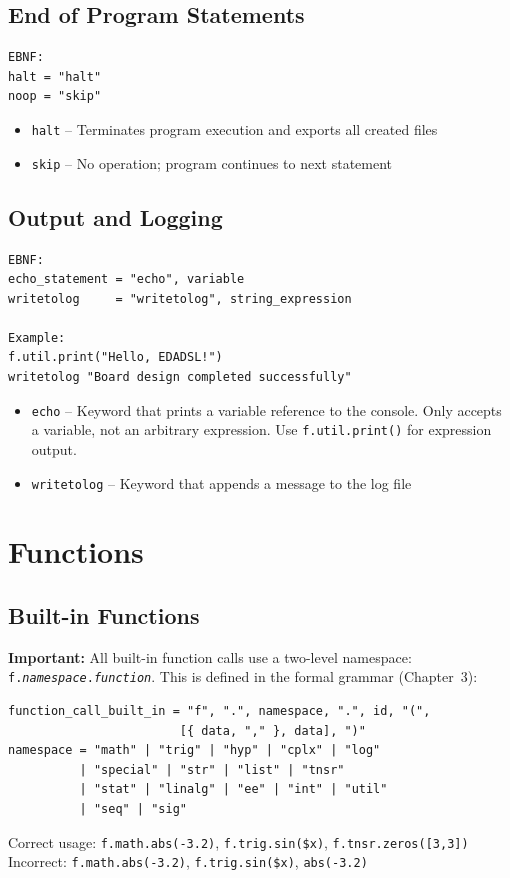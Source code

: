 \section{End of Program Statements}
\begin{verbatim}
EBNF:
halt = "halt"
noop = "skip"
\end{verbatim}
\begin{itemize}
\item \texttt{halt} -- Terminates program execution and exports all created files
\item \texttt{skip} -- No operation; program continues to next statement
\end{itemize}

\section{Output and Logging}
\begin{verbatim}
EBNF:
echo_statement = "echo", variable
writetolog     = "writetolog", string_expression

Example:
f.util.print("Hello, EDADSL!")
writetolog "Board design completed successfully"
\end{verbatim}
\begin{itemize}
\item \texttt{echo} -- Keyword that prints a variable reference to the console. Only accepts a variable, not an arbitrary expression. Use \texttt{f.util.print()} for expression output.
\item \texttt{writetolog} -- Keyword that appends a message to the log file
\end{itemize}




\chapter{Functions}
\section{Built-in Functions}

\textbf{Important:} All built-in function calls use a two-level namespace: \texttt{f.\textit{namespace}.\textit{function}}. This is defined in the formal grammar (Chapter~3):
\begin{verbatim}
function_call_built_in = "f", ".", namespace, ".", id, "(",
                        [{ data, "," }, data], ")"
namespace = "math" | "trig" | "hyp" | "cplx" | "log"
          | "special" | "str" | "list" | "tnsr"
          | "stat" | "linalg" | "ee" | "int" | "util"
          | "seq" | "sig"
\end{verbatim}
Correct usage: \texttt{f.math.abs(-3.2)}, \texttt{f.trig.sin(\$x)}, \texttt{f.tnsr.zeros([3,3])}\\
Incorrect: \texttt{f.math.abs(-3.2)}, \texttt{f.trig.sin(\$x)}, \texttt{abs(-3.2)}

